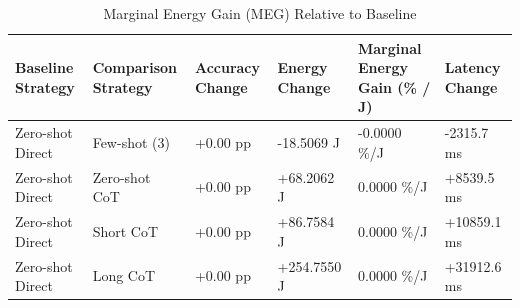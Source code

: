 \begin{table}
\caption{Marginal Energy Gain (MEG) Relative to Baseline}
\label{tab:marginal_energy_gain}
\begin{tabular}{llllll}
\toprule
Baseline Strategy & Comparison Strategy & Accuracy Change & Energy Change & Marginal Energy Gain (\% / J) & Latency Change \\
\midrule
Zero-shot Direct & Few-shot (3) & +0.00 pp & -18.5069 J & -0.0000 \%/J & -2315.7 ms \\
Zero-shot Direct & Zero-shot CoT & +0.00 pp & +68.2062 J & 0.0000 \%/J & +8539.5 ms \\
Zero-shot Direct & Short CoT & +0.00 pp & +86.7584 J & 0.0000 \%/J & +10859.1 ms \\
Zero-shot Direct & Long CoT & +0.00 pp & +254.7550 J & 0.0000 \%/J & +31912.6 ms \\
\bottomrule
\end{tabular}
\end{table}
